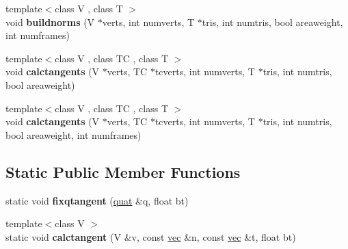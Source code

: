 \begin{DoxyCompactItemize}
\item 
\mbox{\label{structanimmodel_1_1mesh_ac6aad360dc3f947d833a8f1a1a56d4d0}} 
{\footnotesize template$<$class V , class T $>$ }\\void {\bfseries buildnorms} (V $\ast$verts, int numverts, T $\ast$tris, int numtris, bool areaweight, int numframes)
\item 
\mbox{\label{structanimmodel_1_1mesh_a8271ad158eac68d3b5a07110f0d2368e}} 
{\footnotesize template$<$class V , class TC , class T $>$ }\\void {\bfseries calctangents} (V $\ast$verts, TC $\ast$tcverts, int numverts, T $\ast$tris, int numtris, bool areaweight)
\item 
\mbox{\label{structanimmodel_1_1mesh_a65a1088f41aba10cb8347902cbd9778d}} 
{\footnotesize template$<$class V , class TC , class T $>$ }\\void {\bfseries calctangents} (V $\ast$verts, TC $\ast$tcverts, int numverts, T $\ast$tris, int numtris, bool areaweight, int numframes)
\end{DoxyCompactItemize}
\subsection*{Static Public Member Functions}
\begin{DoxyCompactItemize}
\item 
\mbox{\label{structanimmodel_1_1mesh_ac60fd29f55e0cc7e907f23a546ea5755}} 
static void {\bfseries fixqtangent} (\hyperlink{structquat}{quat} \&q, float bt)
\item 
\mbox{\label{structanimmodel_1_1mesh_a24e9629a2c6817e3e828b4c77686b3fa}} 
{\footnotesize template$<$class V $>$ }\\static void {\bfseries calctangent} (V \&v, const \hyperlink{structvec}{vec} \&n, const \hyperlink{structvec}{vec} \&t, float bt)
\end{DoxyCompactItemize}
